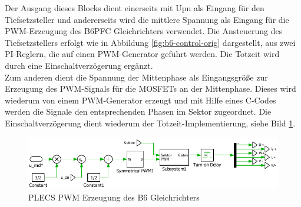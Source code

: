 			Der Ausgang dieses Blocks dient einerseits mit \gls{Upn} als Eingang für den Tiefsetzsteller und andererseits wird die mittlere Spannung als Eingang für die PWM-Erzeugung des \gls{B6PFC} Gleichrichters verwendet. Die Ansteuerung des Tiefsetzstellers erfolgt wie in Abbildung \ref{fig:b6-control-orig} dargestellt, aus zwei PI-Reglern, die auf einen PWM-Generator geführt werden. Die Totzeit wird durch eine Einschaltverzögerung ergänzt.\\
			Zum anderen dient die Spannung der Mittenphase als Eingangsgröße zur Erzeugung des PWM-Signals für die \gls{MOSFET}s an der Mittenphase. Dieses wird wiederum von einem PWM-Generator erzeugt und mit Hilfe eines C-Codes werden die Signale den entsprechenden Phasen im Sektor zugeordnet. Die Einschaltverzögerung dient wiederum der Totzeit-Implementierung, siehe Bild \ref{fig:plecsb6controlpwmmid}.
			
		\begin{figure}
			\centering
			\includegraphics[width=0.9\linewidth]{content/Grafiken/PLECS_B6_ControlPWMmid}
			\caption{PLECS PWM Erzeugung des B6 Gleichrichters}
			\label{fig:plecsb6controlpwmmid}
		\end{figure}
		
		
			
			
